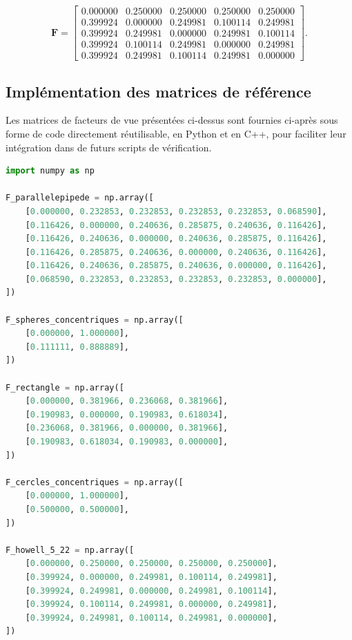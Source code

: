 \begin{equation}
\mathbf{F}=
\begin{bmatrix}
0.000000 & 0.250000 & 0.250000 & 0.250000 & 0.250000 \\
0.399924 & 0.000000 & 0.249981 & 0.100114 & 0.249981 \\
0.399924 & 0.249981 & 0.000000 & 0.249981 & 0.100114 \\
0.399924 & 0.100114 & 0.249981 & 0.000000 & 0.249981 \\
0.399924 & 0.249981 & 0.100114 & 0.249981 & 0.000000
\end{bmatrix}.
\label{eq:FV_cercle_carre}
\end{equation}

\subsection{Implémentation des matrices de référence}
\label{anx:code_matrices}

Les matrices de facteurs de vue présentées ci-dessus sont fournies ci-après sous forme de code directement réutilisable, en Python et en C++, pour faciliter leur intégration dans de futurs scripts de vérification.

\begin{lstlisting}[language=Python, caption={Matrices de facteurs de vue de référence (Python).}, label={lst:fv_python}]
import numpy as np

F_parallelepipede = np.array([
    [0.000000, 0.232853, 0.232853, 0.232853, 0.232853, 0.068590],
    [0.116426, 0.000000, 0.240636, 0.285875, 0.240636, 0.116426],
    [0.116426, 0.240636, 0.000000, 0.240636, 0.285875, 0.116426],
    [0.116426, 0.285875, 0.240636, 0.000000, 0.240636, 0.116426],
    [0.116426, 0.240636, 0.285875, 0.240636, 0.000000, 0.116426],
    [0.068590, 0.232853, 0.232853, 0.232853, 0.232853, 0.000000],
])

F_spheres_concentriques = np.array([
    [0.000000, 1.000000],
    [0.111111, 0.888889],
])

F_rectangle = np.array([
    [0.000000, 0.381966, 0.236068, 0.381966],
    [0.190983, 0.000000, 0.190983, 0.618034],
    [0.236068, 0.381966, 0.000000, 0.381966],
    [0.190983, 0.618034, 0.190983, 0.000000],
])

F_cercles_concentriques = np.array([
    [0.000000, 1.000000],
    [0.500000, 0.500000],
])

F_howell_5_22 = np.array([
    [0.000000, 0.250000, 0.250000, 0.250000, 0.250000],
    [0.399924, 0.000000, 0.249981, 0.100114, 0.249981],
    [0.399924, 0.249981, 0.000000, 0.249981, 0.100114],
    [0.399924, 0.100114, 0.249981, 0.000000, 0.249981],
    [0.399924, 0.249981, 0.100114, 0.249981, 0.000000],
])
\end{lstlisting}
